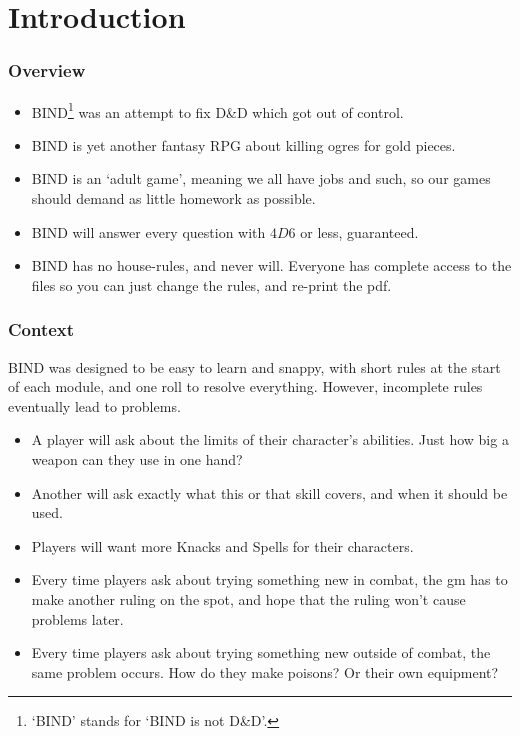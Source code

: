 \chapter*{Introduction}

\begin{multicols}{2}

\subsection*{Overview}

\begin{itemize}
  \item
  BIND\footnote{`BIND' stands for `BIND is not D\&D'.} was an attempt to fix D\&D which got out of control.
  \item
  BIND is yet another fantasy RPG about killing ogres for gold pieces.
  \item
  BIND is an `adult game', meaning we all have jobs and such, so our games should demand as little homework as possible.
  \item
  BIND will answer every question with $4D6$ or less, guaranteed.
  \item
  BIND has no house-rules, and never will.
  Everyone has complete access to the files so you can just change the rules, and re-print the \gls{pdf}.
\end{itemize}

\subsection*{Context}

BIND was designed to be easy to learn and snappy, with short rules at the start of each module, and one roll to resolve everything.
However, incomplete rules eventually lead to problems.

\begin{itemize}
  \item
  A player will ask about the limits of their character's abilities.
  Just how big a weapon can they use in one hand?
  \item
  Another will ask exactly what this or that \gls{skill} covers, and when it should be used.
  \item
  Players will want more Knacks and Spells for their characters.
  \item
  Every time players ask about trying something new in combat, the \gls{gm} has to make another ruling on the spot, and hope that the ruling won't cause problems later.
  \item
  Every time players ask about trying something new outside of combat, the same problem occurs.
  How do they make poisons?
  Or their own equipment?
\end{itemize}


\end{multicols}
